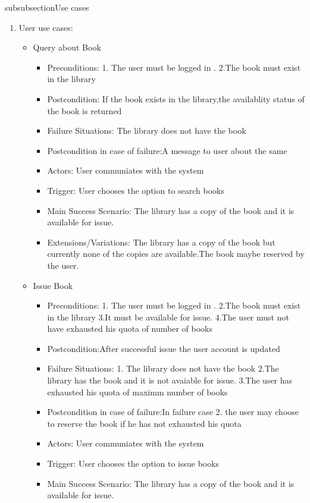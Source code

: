 \documentclass{article}
\begin{document}
subsubsection{Use cases}
\begin{enumerate}
\item User use cases:
	\begin{itemize}
	
	\item Query about Book\\
	\begin{itemize}
	\item Preconditions:
	1. The user must be logged in .
	2.The book must exist in the library
\item  Postcondition: If the book exists in the library,the availablity status of the book is returned
 \item Failure Situations: The library does not have  the book
 \item Postcondition in case of failure:A message to user about the same
\item  Actors: User communiates with the system
\item  Trigger: User chooses the option to search books
 \item Main Success Scenario: The library has a copy of the book and it is available for issue.
\item  Extensions/Variations: The library has a copy of the book but currently none of the copies are available.The book maybe reserved by the user.
	\end{itemize}
 \item Issue Book\\
	\begin{itemize}
	 \item Preconditions:
	 1. The user must be logged in .
	 2.The book must exist in the library 
	 3.It must be available for issue.
	 4.The user must not have exhausted his quota of number of books
 \item Postcondition:After successful issue the user account is updated
 \item Failure Situations:
 1. The library does not have  the book 
 2.The library has the book and it is not avaiable for issue.
 3.The user has exhausted his quota of maximm number of books
 \item Postcondition in case of failure:In failure case 2. the user may choose to reserve the book if he has not exhausted his quota
 \item Actors: User communiates with the system
 \item Trigger: User chooses the option to issue books
 \item Main Success Scenario: The library has a copy of the book and it is available for issue.
	\end{itemize}
 


\end{itemize}
\end{enumerate}
\end{document}

